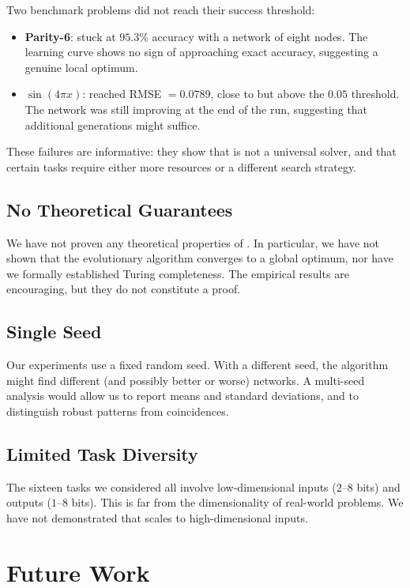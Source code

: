 Two benchmark problems did not reach their success threshold:

\begin{itemize}
  \item \textbf{Parity-6}: stuck at $95.3\%$ accuracy with a network of
    eight nodes. The learning curve shows no sign of approaching exact
    accuracy, suggesting a genuine local optimum.
  \item \textbf{$\sin(4\pi x)$}: reached RMSE $= 0.0789$, close to but
    above the $0.05$ threshold. The network was still improving at the
    end of the run, suggesting that additional generations might
    suffice.
\end{itemize}

These failures are informative: they show that \modnet{} is not a
universal solver, and that certain tasks require either more resources
or a different search strategy.

\subsection{No Theoretical Guarantees}

We have not proven any theoretical properties of \modnet{}. In
particular, we have not shown that the evolutionary algorithm converges
to a global optimum, nor have we formally established Turing
completeness. The empirical results are encouraging, but they do not
constitute a proof.

\subsection{Single Seed}

Our experiments use a fixed random seed. With a different seed, the
algorithm might find different (and possibly better or worse) networks.
A multi-seed analysis would allow us to report means and standard
deviations, and to distinguish robust patterns from coincidences.

\subsection{Limited Task Diversity}

The sixteen tasks we considered all involve low-dimensional inputs
($2$--$8$ bits) and outputs ($1$--$8$ bits). This is far from the
dimensionality of real-world problems. We have not demonstrated that
\modnet{} scales to high-dimensional inputs.

\section{Future Work}

